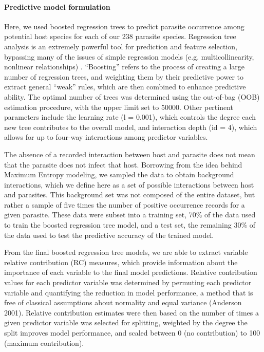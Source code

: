 \documentclass[12pt]{article}
\begin{document}
 
 \paragraph{Predictive model formulation}
  Here, we used boosted regression trees to predict parasite occurrence among potential host species for each of our 238 parasite species. Regression tree analysis is an extremely powerful tool for prediction and feature selection, bypassing many of the issues of simple regression models (e.g. multicollinearity, nonlinear relationships) \cite{elith2008, dallas2014}. “Boosting” refers to the process of creating a large number of regression trees, and weighting them by their predictive power to extract general “weak” rules, which are then combined to enhance predictive ability. The optimal number of trees was determined using the out-of-bag (OOB) estimation procedure, with the upper limit set to 50000. Other pertinent parameters include the learning rate (l = 0.001), which controls the degree each new tree contributes to the overall model, and interaction depth (id = 4), which allows for up to four-way interactions among predictor variables.
  
  The absence of a recorded interaction between host and parasite does not mean that the parasite does not infect that host. Borrowing from the idea behind Maximum Entropy modeling, we sampled the data to obtain background interactions, which we define here as a set of possible interactions between host and parasites. This background set was not composed of the entire dataset, but rather a sample of five times the number of positive occurrence records for a given parasite. These data were subset into a training set, 70\% of the data used to train the boosted regression tree model, and a test set, the remaining 30\% of the data used to test the predictive accuracy of the trained model.
  
  From the final boosted regression tree models, we are able to extract variable relative contribution (RC) measures, which provide information about the importance of each variable to the final model predictions. Relative contribution values for each predictor variable was determined by permuting each predictor variable and quantifying the reduction in model performance, a method that is free of classical assumptions about normality and equal variance (Anderson 2001). Relative contribution estimates were then based on the number of times a given predictor variable was selected for splitting, weighted by the degree the split improves model performance, and scaled between 0 (no contribution) to 100 (maximum contribution). 
  
\end{document}
